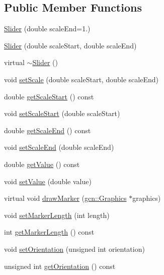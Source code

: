 \subsection*{Public Member Functions}
\begin{DoxyCompactItemize}
\item 
\hyperlink{classgcn_1_1Slider_ab44c64a0f41d16c6459e65c9263ac3d8}{Slider} (double scale\+End=1.)
\item 
\hyperlink{classgcn_1_1Slider_a58afde53c2bf9c065fe85e365c2c2986}{Slider} (double scale\+Start, double scale\+End)
\item 
virtual \hyperlink{classgcn_1_1Slider_a310f68f95c7db6a7346ea5a3417fe98f}{$\sim$\+Slider} ()
\item 
void \hyperlink{classgcn_1_1Slider_a02465b3afdb4d572aef476888d7cdcad}{set\+Scale} (double scale\+Start, double scale\+End)
\item 
double \hyperlink{classgcn_1_1Slider_aeab8fdb1bd7ff808b78129ebc5f4b500}{get\+Scale\+Start} () const 
\item 
void \hyperlink{classgcn_1_1Slider_af78a4f6234a00d8149ca3341b3f33374}{set\+Scale\+Start} (double scale\+Start)
\item 
double \hyperlink{classgcn_1_1Slider_ad6e25610681af89dd1725b0803ab4778}{get\+Scale\+End} () const 
\item 
void \hyperlink{classgcn_1_1Slider_ac36adebe775909357e1790a1ea9b4622}{set\+Scale\+End} (double scale\+End)
\item 
double \hyperlink{classgcn_1_1Slider_afcbdfb0b5a17c4c1a17b40ad1ff9940b}{get\+Value} () const 
\item 
void \hyperlink{classgcn_1_1Slider_a0b80a0f2af00874d2327390818bb16ca}{set\+Value} (double value)
\item 
virtual void \hyperlink{classgcn_1_1Slider_aae235cabf56f58e97755e00445606ec3}{draw\+Marker} (\hyperlink{classgcn_1_1Graphics}{gcn\+::\+Graphics} $\ast$graphics)
\item 
void \hyperlink{classgcn_1_1Slider_a86b945383243c75bdad5f94fbba74bb1}{set\+Marker\+Length} (int length)
\item 
int \hyperlink{classgcn_1_1Slider_a722fa07e303711febaddc8d5bd91cc04}{get\+Marker\+Length} () const 
\item 
void \hyperlink{classgcn_1_1Slider_ade2da18fe81e601c3b8c47d3f05d2ddd}{set\+Orientation} (unsigned int orientation)
\item 
unsigned int \hyperlink{classgcn_1_1Slider_a1053de99e7c7b8b5c8d67d045acae446}{get\+Orientation} () const 
\item 

\end{DoxyCompactItemize}
